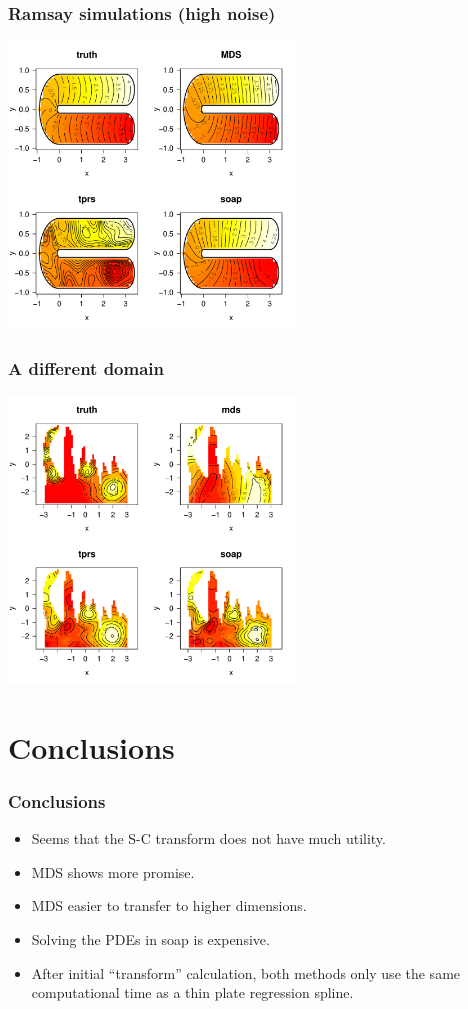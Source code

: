 \documentclass[ignorenonframetext]{beamer} %
\newcommand{\bi}{\begin{itemize}}
\newcommand{\ei}{\end{itemize}}
\begin{document}
\begin{frame}
	\frametitle{Ramsay simulations (high noise)}
            \centering
              \includegraphics[width=3in]{figs/ramsay-high.pdf}\\
\end{frame}

\begin{frame}
	\frametitle{A different domain}
            \centering
              \includegraphics[width=3in]{figs/wt2-real.pdf}\\
\end{frame}

\section{Conclusions}

\begin{frame}
	\frametitle{Conclusions}
       \bi
         \item Seems that the S-C transform does not have much utility.
         \item MDS shows more promise.
         \item MDS easier to transfer to higher dimensions.
         \item Solving the PDEs in soap is expensive.
         \item After initial ``transform'' calculation, both methods only use the same computational time as a thin plate regression spline.
        \ei
\end{frame}
\end{document}
